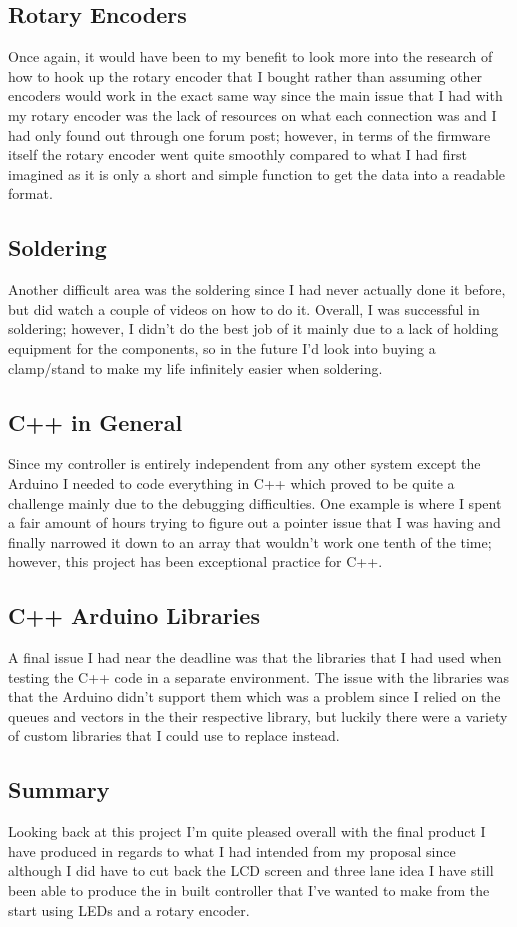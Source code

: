 \documentclass{article}
\begin{document}
\subsection{Rotary Encoders}
Once again, it would have been to my benefit to look more into the research of how to hook up the rotary encoder that I bought rather than assuming other encoders would work in the exact same way since the main issue that I had with my rotary encoder was the lack of resources on what each connection was and I had only found out through one forum post; however, in terms of the firmware itself the rotary encoder went quite smoothly compared to what I had first imagined as it is only a short and simple function to get the data into a readable format.
\\

\subsection{Soldering}
Another difficult area was the soldering since I had never actually done it before, but did watch a couple of videos on how to do it. Overall, I was successful in soldering; however, I didn't do the best job of it mainly due to a lack of holding equipment for the components, so in the future I'd look into buying a clamp/stand to make my life infinitely easier when soldering.
\\

\subsection{C++ in General}
Since my controller is entirely independent from any other system except the Arduino I needed to code everything in C++ which proved to be quite a challenge mainly due to the debugging difficulties. One example is where I spent a fair amount of hours trying to figure out a pointer issue that I was having and finally narrowed it down to an array that wouldn't work one tenth of the time; however, this project has been exceptional practice for C++.
\\

\subsection{C++ Arduino Libraries}
A final issue I had near the deadline was that the libraries that I had used when testing the C++ code in a separate environment. The issue with the libraries was that the Arduino didn't support them which was a problem since I relied on the queues and vectors in the their respective library, but luckily there were a variety of custom libraries that I could use to replace instead.
\\

\subsection{Summary}
Looking back at this project I'm quite pleased overall with the final product I have produced in regards to what I had intended from my proposal since although I did have to cut back the LCD screen and three lane idea I have still been able to produce the in built controller that I've wanted to make from the start using LEDs and a rotary encoder.
\end{document}
